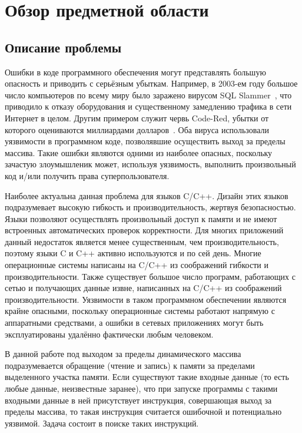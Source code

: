 \chapter{Обзор предметной области}

\section{Описание проблемы}

Ошибки в коде программного обеспечения могут представлять большую
опасность и приводить с серьёзным убыткам. Например, в 2003-ем году
большое число компьютеров по всему миру было заражено вирусом SQL
Slammer~\cite{moore2003spread}, что приводило к отказу оборудования и
существенному замедлению трафика в сети Интернет в целом. Другим
примером служит червь Code-Red, убытки от которого оцениваются
миллиардами долларов~\cite{moore2002code}. Оба вируса использовали
уязвимости в программном коде, позволявшие осуществить выход за
пределы массива. Такие ошибки являются одними из наиболее опасных,
поскольку зачастую злоумышленик может, используя уязвимость, выполнить
произвольный код и/или получить права
суперпользователя\cite{onesmashing}.

Наиболее актуальна данная проблема для языков C/C++. Дизайн этих
языков подразумевает высокую гибкость и производительность, жертвуя
безопасностью. Языки позволяют осуществлять произвольный доступ к
памяти и не имеют встроенных автоматических проверок корректности. Для
многих приложений данный недостаток является менее существенным, чем
производительность, поэтому языки C и C++ активно используются и по
сей день. Многие операционные системы написаны на C/C++ из соображений
гибкости и производительности. Также существует большое число
программ, работающих с сетью и получающих данные извне, написанных на
C/C++ из соображений производительности. Уязвимости в таком
программном обеспечении являются крайне опасными, поскольку
операционные системы работают напрямую с аппаратными средствами, а
ошибки в сетевых приложениях могут быть эксплуатированы удалённо
фактически любым человеком.

В данной работе под выходом за пределы динамического массива
подразумевается обращение (чтение и запись) к памяти за пределами
выделенного участка памяти. Если существуют такие входные данные (то
есть любые данные, неизвестные заранее), что при запуске программы с
такими входными данные в ней присутствует инструкция, совершающая
выход за пределы массива, то такая инструкция считается ошибочной и
потенциально уязвимой. Задача состоит в поиске таких инструкций.

